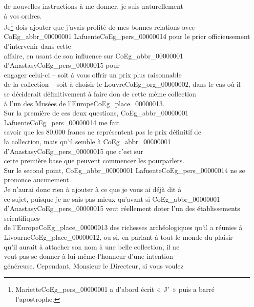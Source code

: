 \documentclass{book}
\begin{document}
de nouvelles instructions à me donner, je suis naturellement\\
à vos ordres.\\
\indent Je\footnote{Mariette\gls{CoEg_pers_00000001} a d'abord écrit «~J'~» puis a barré l'apostrophe.} dois ajouter que j’avais profité de mes bonnes relations avec\\
\gls{CoEg_abbr_00000001} Lafuente\gls{CoEg_pers_00000014} pour le prier officieusement d’intervenir dans cette\\
affaire, en usant de son influence sur \gls{CoEg_abbr_00000001} d’Anastasy\gls{CoEg_pers_00000015} pour\\
engager celui-ci – soit à vous offrir un prix plus raisonnable\\
de la collection – soit à choisir le Louvre\gls{CoEg_org_00000002}, dans le cas où il\\
se déciderait définitivement à faire don de cette même collection\\
à l’un des Musées de l’Europe\gls{CoEg_place_00000013}.\\
\indent Sur la première de ces deux questions, \gls{CoEg_abbr_00000001} Lafuente\gls{CoEg_pers_00000014} me fait\\
savoir que les 80,000 francs ne représentent pas le prix définitif de\\
la collection, mais qu’il semble à \gls{CoEg_abbr_00000001} d’Anastasy\gls{CoEg_pers_00000015} que c’est sur\\
cette première base que peuvent commencer les pourparlers.\\
\indent Sur le second point, \gls{CoEg_abbr_00000001} Lafuente\gls{CoEg_pers_00000014} ne se prononce aucunement.\\
Je n’aurai donc rien à ajouter à ce que je vous ai déjà dit à\\
ce sujet, puisque je ne sais pas mieux qu’avant si \gls{CoEg_abbr_00000001}\\
d’Anastasy\gls{CoEg_pers_00000015} veut réellement doter l’un des établissements scientifiques\\
de l’Europe\gls{CoEg_place_00000013} des richesses archéologiques qu’il a réunies à\\
Livourne\gls{CoEg_place_00000012}, ou si, en parlant à tout le monde du plaisir\\
qu’il aurait à attacher son nom à une belle collection, il ne\\
veut pas se donner à lui-même l’honneur d’une intention\\
généreuse. Cependant, Monsieur le Directeur, si vous voulez\\
\end{document}

